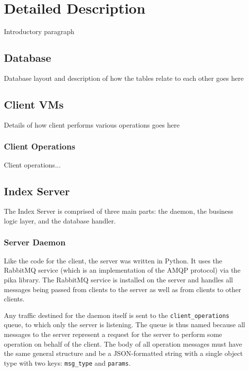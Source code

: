 \section{Detailed Description}
	
	Introductory paragraph
	
	\subsection{Database}
		\label{sec:db}
		
		Database layout and description of how the tables relate to each other goes here
		
		
	\subsection{Client VMs}
		\label{sec:clients}
		
		Details of how client performs various operations goes here
		
		\subsubsection{Client Operations}
			\label{sec:client_ops}\hypertarget{sec:client_ops}{}
			
			Client operations...
		
		
	\subsection{Index Server}
		\label{sec:server}
		
		The Index Server is comprised of three main parts: the daemon, the business logic layer, and the database handler.
		
		\subsubsection{Server Daemon}
			
			Like the code for the client, the server was written in Python.  It uses the RabbitMQ service (which is an implementation of the AMQP protocol) via the pika library.  The RabbitMQ service is installed on the server and handles all messages being passed from clients to the server as well as from clients to other clients.
			
			Any traffic destined for the daemon itself is sent to the \verb|client_operations| queue, to which only the server is listening.  The queue is thus named because all messages to the server represent a request for the server to perform some operation on behalf of the client.  The body of all operation messages must have the same general structure and be a JSON-formatted string with a single object type with two keys: \verb|msg_type| and \verb|params|.
			
